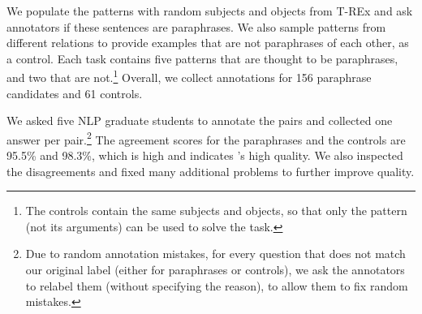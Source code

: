 
We populate the patterns with random subjects and objects from T-REx \cite{trex} and ask annotators if these sentences are paraphrases.
We also sample patterns from different relations to provide
examples that are not paraphrases of each other, as a control.
Each task contains five patterns that are thought
to be paraphrases, and two that are not.\footnote{The
  controls contain the same subjects and objects, so
  that only the pattern (not its arguments) can be used to
  solve the task.}
Overall, we collect annotations for 156 paraphrase candidates and 61 controls.



We asked five NLP graduate students to  annotate the pairs and collected one answer per pair.\footnote{Due to random annotation mistakes, for every question
that does not match our original label (either for
paraphrases or controls), we ask the annotators to relabel
them (without specifying the reason), to allow them to fix
random mistakes.}
The agreement scores for the paraphrases and the controls
are 95.5\% and 98.3\%, which is high and
indicates \resource's high quality.
We also inspected  the disagreements  %
and fixed many additional problems %
to further improve  quality.
% 



